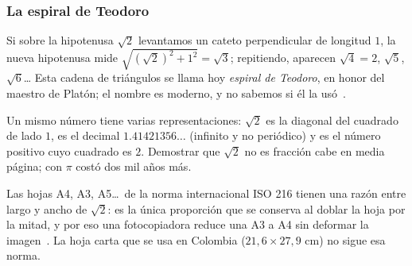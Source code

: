 \documentclass[11pt]{article}
\begin{document}
\subsubsection*{La espiral de Teodoro}

Si sobre la hipotenusa $\sqrt{2}$ levantamos un cateto perpendicular de
longitud $1$, la nueva hipotenusa mide $\sqrt{(\sqrt{2})^2 + 1^2} =
\sqrt{3}$; repitiendo, aparecen $\sqrt{4} = 2$, $\sqrt{5}$, $\sqrt{6}$\ldots
Esta cadena de triángulos se llama hoy \emph{espiral de Teodoro}, en honor
del maestro de Platón; el nombre es moderno, y no sabemos si él la
usó~\cite{davis}.

\begin{center}
\end{center}

Un mismo número tiene varias representaciones: $\sqrt{2}$ es la diagonal del
cuadrado de lado $1$, es el decimal $\num{1,41421356}\ldots$ (infinito y no
periódico) y es el número positivo cuyo cuadrado es $2$. Demostrar que
$\sqrt{2}$ no es fracción cabe en media página; con $\pi$ costó dos mil años
más.

\begin{aplicacion}[La hoja A4]
Las hojas A4, A3, A5\ldots\ de la norma internacional ISO 216 tienen una
razón entre largo y ancho de $\sqrt{2}$: es la única proporción que se
conserva al doblar la hoja por la mitad, y por eso una fotocopiadora reduce
una A3 a A4 sin deformar la imagen~\cite{iso216}. La hoja carta que se usa en
Colombia ($21{,}6 \times 27{,}9$ cm) no sigue esa norma.
\end{aplicacion}
\end{document}

